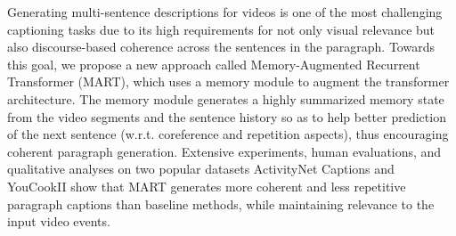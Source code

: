 Generating multi-sentence descriptions for videos is one of the most challenging captioning tasks due to its high requirements for not only visual relevance but also discourse-based coherence across the sentences in the paragraph. Towards this goal, we propose a new approach called Memory-Augmented Recurrent Transformer (MART), which uses a memory module to augment the transformer architecture. The memory module generates a highly summarized memory state from the video segments and the sentence history so as to help better prediction of the next sentence (w.r.t. coreference and repetition aspects), thus encouraging coherent paragraph generation. Extensive experiments, human evaluations, and qualitative analyses on two popular datasets ActivityNet Captions and YouCookII show that MART generates more coherent and less repetitive paragraph captions than baseline methods, while maintaining relevance to the input video events.

